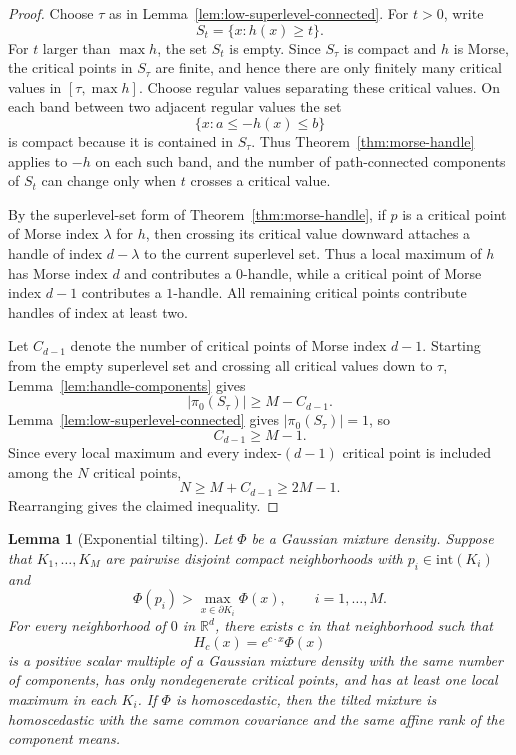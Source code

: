 \documentclass[11pt]{article}
\theoremstyle{plain}
\newtheorem{lemma}[theorem]{Lemma}
\theoremstyle{definition}
\theoremstyle{remark}
\numberwithin{equation}{section}
\newcommand{\R}{\mathbb{R}}
\begin{document}
\begin{proof}
Choose $\tau$ as in Lemma~\ref{lem:low-superlevel-connected}. For $t>0$, write
\[
S_t=\{x:h(x)\ge t\}.
\]
For $t$ larger than $\max h$, the set $S_t$ is empty. Since $S_\tau$ is compact and $h$ is Morse, the critical points in $S_\tau$ are finite, and hence there are only finitely many critical values in $[\tau,\max h]$. Choose regular values separating these critical values. On each band between two adjacent regular values the set
\[
\{x:a\le -h(x)\le b\}
\]
is compact because it is contained in $S_\tau$. Thus Theorem~\ref{thm:morse-handle} applies to $-h$ on each such band, and the number of path-connected components of $S_t$ can change only when $t$ crosses a critical value.

By the superlevel-set form of Theorem~\ref{thm:morse-handle}, if $p$ is a critical point of Morse index $\lambda$ for $h$, then crossing its critical value downward attaches a handle of index $d-\lambda$ to the current superlevel set. Thus a local maximum of $h$ has Morse index $d$ and contributes a $0$-handle, while a critical point of Morse index $d-1$ contributes a $1$-handle. All remaining critical points contribute handles of index at least two.

Let $C_{d-1}$ denote the number of critical points of Morse index $d-1$. Starting from the empty superlevel set and crossing all critical values down to $\tau$, Lemma~\ref{lem:handle-components} gives
\[
|\pi_0(S_\tau)|\ge M-C_{d-1}.
\]
Lemma~\ref{lem:low-superlevel-connected} gives $|\pi_0(S_\tau)|=1$, so
\[
C_{d-1}\ge M-1.
\]
Since every local maximum and every index-$(d-1)$ critical point is included among the $N$ critical points,
\[
N\ge M+C_{d-1}\ge 2M-1.
\]
Rearranging gives the claimed inequality.
\end{proof}

\begin{lemma}[Exponential tilting]\label{lem:generic-tilt}
Let $\Phi$ be a Gaussian mixture density. Suppose that $K_1,\dots,K_M$ are pairwise disjoint compact neighborhoods with $p_i\in\mathrm{int}(K_i)$ and
\[
\Phi(p_i)>\max_{x\in\partial K_i}\Phi(x),
\qquad i=1,\dots,M.
\]
For every neighborhood of $0$ in $\R^d$, there exists $c$ in that neighborhood such that
\[
H_c(x)=e^{c\cdot x}\Phi(x)
\]
is a positive scalar multiple of a Gaussian mixture density with the same number of components, has only nondegenerate critical points, and has at least one local maximum in each $K_i$. If $\Phi$ is homoscedastic, then the tilted mixture is homoscedastic with the same common covariance and the same affine rank of the component means.
\end{lemma}
\end{document}
